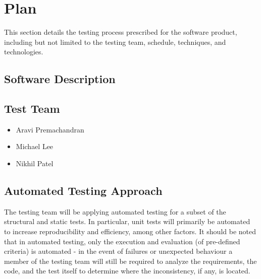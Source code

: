 \documentclass[12pt, titlepage]{article}
\begin{document}
	\section{Plan}
	This section details the testing process prescribed for the software 
	product, including but not limited to the testing team, schedule, 
	techniques, and technologies.
	\subsection{Software Description}

	\subsection{Test Team}
	\begin{itemize}
		\itemsep0em
		\item Aravi Premachandran
		\item Michael Lee
		\item Nikhil Patel
	\end{itemize}
	\subsection{Automated Testing Approach}
	\indent \indent The testing team will be applying automated testing for a 
	subset of the structural and static tests. In particular, unit tests will 
	primarily be automated to increase reproducibility and efficiency, among 
	other factors. It should be noted that in automated testing, only the 
	execution and evaluation (of pre-defined criteria) is automated - in the 
	event of failures or unexpected behaviour a member of the testing team will 
	still be required to analyze the requirements, the code, and the test 
	itself to determine where the inconsistency, if any, is located.
	
\end{document}
